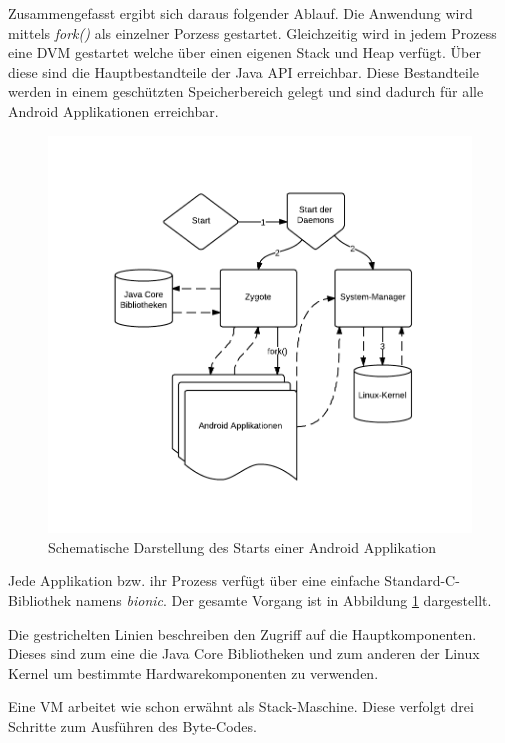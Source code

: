  Zusammengefasst ergibt sich daraus folgender Ablauf. Die Anwendung wird mittels \textit{fork()} als einzelner Porzess gestartet. Gleichzeitig wird in jedem Prozess eine DVM gestartet welche über einen eigenen Stack und Heap verfügt. Über diese sind die Hauptbestandteile der Java API erreichbar. Diese Bestandteile werden in einem geschützten Speicherbereich gelegt und sind dadurch für alle Android Applikationen erreichbar.
 
 \begin{figure}[ht!]
 \begin{center}
 \includegraphics[scale=0.5]{images/dvm}
 \caption{Schematische Darstellung des Starts einer Android Applikation}
 \label{dvm}
 \end{center}
 \end{figure}
 
 Jede Applikation bzw. ihr Prozess verfügt über eine einfache Standard-C-Bibliothek namens \textit{bionic}. Der gesamte Vorgang ist in Abbildung \ref{dvm} dargestellt.
 
 Die gestrichelten Linien beschreiben den Zugriff auf die Hauptkomponenten. Dieses sind zum eine die Java Core Bibliotheken und zum anderen der Linux Kernel um bestimmte Hardwarekomponenten zu verwenden.
 
 Eine VM arbeitet wie schon erwähnt als Stack-Maschine. Diese verfolgt drei Schritte zum Ausführen des Byte-Codes.
 
